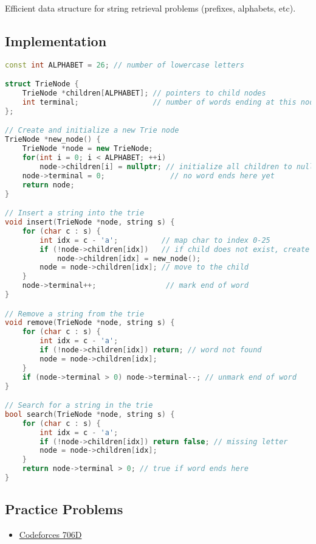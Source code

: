 \documentclass[12pt]{article}
\begin{document}
Efficient data structure for string retrieval problems (prefixes, alphabets, etc).

\subsection{Implementation}

\begin{lstlisting}[language=C++]
const int ALPHABET = 26; // number of lowercase letters

struct TrieNode {
    TrieNode *children[ALPHABET]; // pointers to child nodes
    int terminal;                 // number of words ending at this node
};

// Create and initialize a new Trie node
TrieNode *new_node() {
    TrieNode *node = new TrieNode;
    for(int i = 0; i < ALPHABET; ++i)
        node->children[i] = nullptr; // initialize all children to null
    node->terminal = 0;               // no word ends here yet
    return node;
}

// Insert a string into the trie
void insert(TrieNode *node, string s) {
    for (char c : s) {
        int idx = c - 'a';          // map char to index 0-25
        if (!node->children[idx])   // if child does not exist, create it
            node->children[idx] = new_node();
        node = node->children[idx]; // move to the child
    }
    node->terminal++;                // mark end of word
}

// Remove a string from the trie
void remove(TrieNode *node, string s) {
    for (char c : s) {
        int idx = c - 'a';
        if (!node->children[idx]) return; // word not found
        node = node->children[idx];
    }
    if (node->terminal > 0) node->terminal--; // unmark end of word
}

// Search for a string in the trie
bool search(TrieNode *node, string s) {
    for (char c : s) {
        int idx = c - 'a';
        if (!node->children[idx]) return false; // missing letter
        node = node->children[idx];
    }
    return node->terminal > 0; // true if word ends here
}
\end{lstlisting}

\subsection{Practice Problems}
\begin{itemize}
    \item \href{https://codeforces.com/problemset/problem/706/D}{Codeforces 706D}
\end{itemize}
\end{document}
